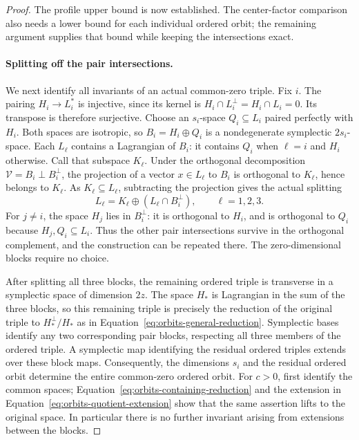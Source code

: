 \begin{proof}
The profile upper bound is now established. The center-factor comparison
also needs a lower bound for each individual ordered orbit; the remaining
argument supplies that bound while keeping the intersections exact.

\paragraph{Splitting off the pair intersections.}
We next identify all invariants of an actual common-zero triple.  Fix
$i$.  The pairing $H_i\to L_i^*$ is injective, since its kernel is
$H_i\cap L_i^\perp=H_i\cap L_i=0$.  Its transpose is therefore
surjective.  Choose an $s_i$-space $Q_i\subseteq L_i$ paired perfectly
with $H_i$.  Both spaces are isotropic, so
$B_i=H_i\oplus Q_i$ is a nondegenerate symplectic $2s_i$-space.
Each $L_\ell$ contains a Lagrangian of $B_i$: it contains $Q_i$ when
$\ell=i$ and $H_i$ otherwise.  Call that subspace $K_\ell$.
Under the orthogonal decomposition $\mathcal V=B_i\mathbin\perp B_i^\perp$,
the projection of a vector $x\in L_\ell$ to $B_i$ is orthogonal to
$K_\ell$, hence belongs to $K_\ell$.  As $K_\ell\subseteq L_\ell$,
subtracting the projection gives the actual splitting
\begin{equation}
 L_\ell=K_\ell\oplus(L_\ell\cap B_i^\perp),
 \qquad \ell=1,2,3.
 \label{eq:orbits-forced-splitting}
\end{equation}
For $j\ne i$, the space $H_j$ lies in $B_i^\perp$: it is orthogonal to
$H_i$, and is orthogonal to $Q_i$ because $H_j,Q_i\subseteq L_i$.
Thus the other pair intersections survive in the orthogonal complement,
and the construction can be repeated there.  The zero-dimensional
blocks require no choice.

After splitting all three blocks, the remaining ordered triple is
transverse in a symplectic space of dimension $2z$.  The space $H_*$
is Lagrangian in the sum of the three blocks, so this remaining triple
is precisely the reduction of the original triple to $H_*^\perp/H_*$
as in Equation~\eqref{eq:orbits-general-reduction}.
Symplectic bases identify any two corresponding pair blocks, respecting
all three members of the ordered triple.  A symplectic map identifying
the residual ordered triples extends over these block maps.  Consequently,
the dimensions $s_i$ and the residual ordered orbit determine the entire
common-zero ordered orbit.  For $c>0$, first identify the common spaces;
Equation~\eqref{eq:orbits-containing-reduction} and the extension in
Equation~\eqref{eq:orbits-quotient-extension} show that the same assertion
lifts to the original space.  In particular there is no further invariant
arising from extensions between the blocks.


\end{proof}

